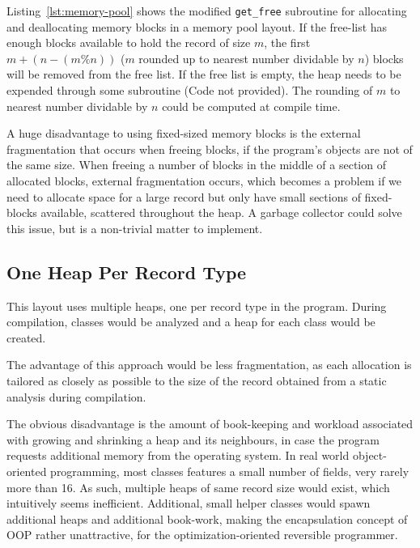 Listing~\ref{lst:memory-pool} shows the modified \texttt{get\_free} subroutine for allocating and deallocating memory blocks in a memory pool layout. If the free-list has enough blocks available to hold the record of size $m$, the first $m + (n - (m \% n))$ ($m$ rounded up to nearest number dividable by $n$) blocks will be removed from the free list. If the free list is empty, the heap needs to be expended through some subroutine (Code not provided). The rounding of $m$ to nearest number dividable by $n$ could be computed at compile time.

A huge disadvantage to using fixed-sized memory blocks is the external fragmentation that occurs when freeing blocks, if the program's objects are not of the same size. When freeing a number of blocks in the middle of a section of allocated blocks, external fragmentation occurs, which becomes a problem if we need to allocate space for a large record but only have small sections of fixed-blocks available, scattered throughout the heap. A garbage collector could solve this issue, but is a non-trivial matter to implement.



\subsection{One Heap Per Record Type}
This layout uses multiple heaps, one per record type in the program. During compilation, classes would be analyzed and a heap for each class would be created. 

The advantage of this approach would be less fragmentation, as each allocation is tailored as closely as possible to the size of the record obtained from a static analysis during compilation.

The obvious disadvantage is the amount of book-keeping and workload associated with growing and shrinking a heap and its neighbours, in case the program requests additional memory from the operating system. In real world object-oriented programming, most classes features a small number of fields, very rarely more than 16. As such, multiple heaps of same record size would exist, which intuitively seems inefficient. Additional, small helper classes would spawn additional heaps and additional book-work, making the encapsulation concept of OOP rather unattractive, for the optimization-oriented reversible programmer.

